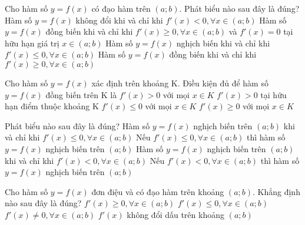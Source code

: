 \begin{ex}%
	Cho hàm số $y=f(x)$ có đạo hàm trên $(a;b)$. Phát biểu nào sau đây là đúng?
	\choice
	{Hàm số $y=f(x)$ không đổi khi và chỉ khi $f'(x)<0,\forall x\in(a;b)$}
	{\True Hàm số $y=f(x)$ đồng biến khi và chỉ khi $f'(x)\geq 0,\forall x\in(a;b)$ và $f'(x)=0$ tại hữu hạn giá trị $x\in(a;b)$}
	{Hàm số $y=f(x)$ nghịch biến khi và chỉ khi $f'(x)\leq 0,\forall x\in(a;b)$}
	{Hàm số $y=f(x)$ đồng biến khi và chỉ khi $f'(x)\geq 0,\forall x\in(a;b)$}
\end{ex}

\begin{ex}%
	Cho hàm số $y=f(x)$ xác định trên khoảng K. Điều kiện đủ để hàm số $y=f(x)$ đồng biến trên K là 
	\choice
	{\True $f'(x)>0$ với mọi $x\in K$}
	{$f'(x)>0$ tại hữu hạn điểm thuộc khoảng K}
	{$f'(x)\leq 0$ với mọi $x\in K$}
	{$f'(x)\geq 0$ với mọi $x\in K$}
\end{ex}

\begin{ex}%
	Phát biểu nào sau đây là đúng?
	\choice
	{Hàm số $y=f(x)$ nghịch biến trên $(a;b)$ khi và chỉ khi $f'(x)\leq 0,\forall x\in(a;b)$}
	{Nếu $f'(x)\leq 0,\forall x\in(a;b)$ thì hàm số $y=f(x)$ nghịch biến trên $(a;b)$}
	{Hàm số $y=f(x)$ nghịch biến trên $(a;b)$ khi và chỉ khi $f'(x)<0,\forall x\in(a;b)$}
	{\True Nếu $f'(x)<0,\forall x\in(a;b)$ thì hàm số $y=f(x)$ nghịch biến trên $(a;b)$}
\end{ex}

\begin{ex}%
	Cho hàm số $y=f(x)$ đơn điệu và có đạo hàm trên khoảng $(a;b)$. Khẳng định nào sau đây là đúng?
	\choice
	{$f'(x)\geq 0,\forall x\in(a;b)$}
	{$f'(x)\leq 0,\forall x\in(a;b)$}
	{$f'(x)\neq 0,\forall x\in(a;b)$}
	{\True $f'(x)$ không đổi dấu trên khoảng $(a;b)$}
\end{ex}

